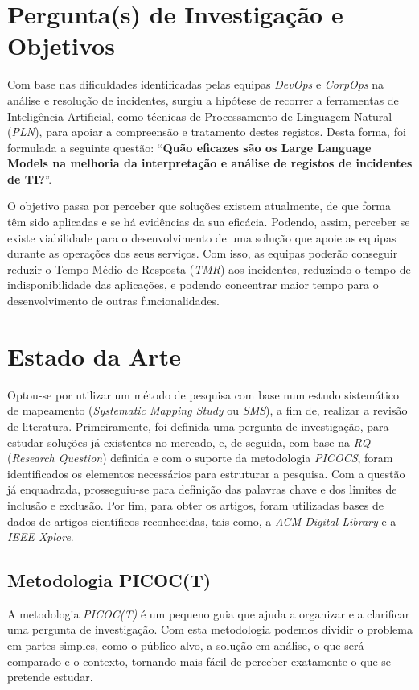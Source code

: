 \section{Pergunta(s) de Investigação e Objetivos}
	Com base nas dificuldades identificadas pelas equipas \textit{DevOps} e \textit{CorpOps} na análise e resolução de incidentes, surgiu a hipótese de recorrer a ferramentas de Inteligência Artificial, como técnicas de Processamento de Linguagem Natural (\textit{PLN}), para apoiar a compreensão e tratamento destes registos. Desta forma, foi formulada a seguinte questão: “\textbf{Quão eficazes são os Large Language Models na melhoria da interpretação e análise de registos de incidentes de TI?}”.
	
	O objetivo passa por perceber que soluções existem atualmente, de que forma têm sido aplicadas e se há evidências da sua eficácia. Podendo, assim, perceber se existe viabilidade para o desenvolvimento de uma solução que apoie as equipas durante as operações dos seus serviços. Com isso, as equipas poderão conseguir reduzir o Tempo Médio de Resposta (\textit{TMR}) aos incidentes, reduzindo o tempo de indisponibilidade das aplicações, e podendo concentrar maior tempo para o desenvolvimento de outras funcionalidades.

\section{Estado da Arte}
	Optou-se por utilizar um método de pesquisa com base num estudo sistemático de mapeamento (\textit{Systematic Mapping Study} ou \textit{SMS}), a fim de, realizar a revisão de literatura. Primeiramente, foi definida uma pergunta de investigação, para estudar soluções já existentes no mercado, e, de seguida, com base na \textit{RQ} (\textit{Research Question}) definida e com o suporte da metodologia \textit{PICOCS}, foram identificados os elementos necessários para estruturar a pesquisa. Com a questão já enquadrada, prosseguiu-se para definição das palavras chave e dos limites de inclusão e exclusão. Por fim, para obter os artigos, foram utilizadas bases de dados de artigos científicos reconhecidas, tais como, a \textit{ACM Digital Library} e a \textit{IEEE Xplore}.
	
	\subsection{Metodologia PICOC(T)}
		A metodologia \textit{PICOC(T)} é um pequeno guia que ajuda a organizar e a clarificar uma pergunta de investigação. Com esta metodologia podemos dividir o problema em partes simples, como o público-alvo, a solução em análise, o que será comparado e o contexto, tornando mais fácil de perceber exatamente o que se pretende estudar.
		
